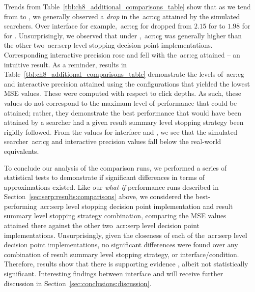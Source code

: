 Trends from Table~\ref{tbl:ch8_additional_comparisons_table} show that as we tend from  to , we generally observed a \emph{drop} in the~\gls{acr:cg} attained by the simulated searchers. Over interface  for example,~\gls{acr:cg} for  dropped from $2.15$ for  to $1.98$ for  for . Unsurprisingly, we observed that under ,~\gls{acr:cg} was generally higher than the other two~\gls{acr:serp} level stopping decision point implementations. Corresponding interactive precision rose and fell with the~\gls{acr:cg} attained -- an intuitive result. As a reminder, results in Table~\ref{tbl:ch8_additional_comparisons_table} demonstrate the levels of~\gls{acr:cg} and interactive precision attained using the configurations that yielded the lowest MSE values. These were computed with respect to click depths. As such, these values do not correspond to the maximum level of performance that could be attained; rather, they demonstrate the best performance that would have been attained by a searcher had a given result summary level stopping strategy been rigidly followed. From the  values for interface  and , we see that the simulated searcher~\gls{acr:cg} and interactive precision values fall below the real-world equivalents.

To conclude our analysis of the comparison runs, we performed a series of statistical tests to demonstrate if significant differences in terms of approximations existed. Like our \emph{what-if} performance runs described in Section~\ref{sec:serp:results:comparisons} above, we considered the best-performing~\gls{acr:serp} level stopping decision point implementation and result summary level stopping strategy combination, comparing the MSE values attained there against the other two~\gls{acr:serp} level decision point implementations. Unsurprisingly, given the closeness of each of the~\gls{acr:serp} level decision point implementations, no significant differences were found over any combination of result summary level stopping strategy, or interface/condition. Therefore, results show that there is supporting evidence , albeit not statistically significant. Interesting findings between interface  and  will receive further discussion in Section~\ref{sec:conclusions:discussion}.

